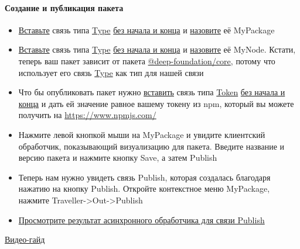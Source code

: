 \paragraph{Создание и публикация пакета}
\begin{itemize}
      \item \hyperlink{DeepCase.InsertLink.Description}{Вставьте} связь типа
            \hyperlink{Core.Package.Description}{Type}
            \hyperlink{FAQ.HowToInsertLinkWithoutFromAndTo}{без начала и конца}
            и
            \hyperlink{FAQ.HowToSetName}{назовите} её MyPackage
      \item \hyperlink{DeepCase.InsertLink.Description}{Вставьте} связь типа
            \hyperlink{Core.Package.Description}{Type}
            \hyperlink{FAQ.HowToInsertLinkWithoutFromAndTo}{без начала и конца}
            и
            \hyperlink{FAQ.HowToSetName}{назовите} её MyNode. Кстати, теперь
            ваш
            пакет
            зависит от пакета
            \hyperlink{Core.Description}{@deep-foundation/core},
            потому что
            использует его связь \hyperlink{Core.Type.Description}{Type} как
            тип
            для нашей связи
      \item Что бы опубликовать пакет нужно
            \hyperlink{DeepCase.InsertLink.Description}{вставить} связь типа
            \hyperlink{NpmPackager.Token.Description}{Token}
            \hyperlink{FAQ.HowToInsertLinkWithoutFromAndTo}{без начала и конца}
            и
            дать ей
            значение равное вашему токену из npm, который вы можете получить на
            \url{https://www.npmjs.com/}
      \item Нажмите левой кнопкой мыши на MyPackage и увидите клиентский
            обработчик, показывающий визуализацию для пакета. Введите название
            и
            версию
            пакета и нажмите кнопку Save, а затем Publish
      \item Теперь нам нужно увидеть связь Publish, которая создалась благодаря
            нажатию на кнопку Publish. Откройте контекстное меню MyPackage,
            нажмите
            Traveller->Out->Publish
      \item \hyperlink{Handlers.Async.HowToGetResult}{Просмотрите результат
                  асинхронного обработчика для связи Publish}
\end{itemize}
\href{https://youtu.be/k6dKOrwDMco}{Видео-гайд}

